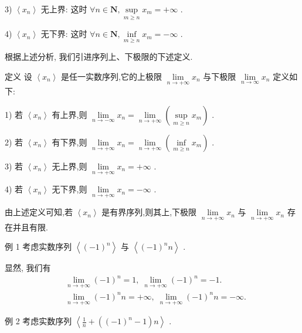 3) $\left\langle  {x}_{n}\right\rangle$ 无上界: 这时 $\forall n \in  \mathbf{N},\mathop{\sup }\limits_{{m \geq  n}}{x}_{m} =  + \infty$ .

4) $\left\langle  {x}_{n}\right\rangle$ 无下界: 这时 $\forall n \in  \mathbf{N},\mathop{\inf }\limits_{{m \geq  n}}{x}_{m} =  - \infty$ .

根据上述分析, 我们引进序列上、下极限的下述定义.

定义 设 $\left\langle  {x}_{n}\right\rangle$ 是任一实数序列,它的上极限 $\mathop{\lim }\limits_{{n \rightarrow   + \infty }}{x}_{n}$ 与下极限 $\mathop{\lim }\limits_{{n \rightarrow  \infty }}{x}_{n}$ 定义如下:

1) 若 $\left\langle  {x}_{n}\right\rangle$ 有上界,则 $\mathop{\lim }\limits_{{n \rightarrow   - \infty }}{x}_{n} = \mathop{\lim }\limits_{{n \rightarrow   + \infty }}\left( {\mathop{\sup }\limits_{{m \geq  n}}{x}_{m}}\right)$ .

2) 若 $\left\langle  {x}_{n}\right\rangle$ 有下界,则 $\mathop{\lim }\limits_{{n \rightarrow   + \infty }}{x}_{n} = \mathop{\lim }\limits_{{n \rightarrow   + \infty }}\left( {\mathop{\inf }\limits_{{m \geq  n}}{x}_{m}}\right)$ .

3) 若 $\left\langle  {x}_{n}\right\rangle$ 无上界,则 $\mathop{\lim }\limits_{{n \rightarrow   + \infty }}{x}_{n} =  + \infty$ .

4) 若 $\left\langle  {x}_{n}\right\rangle$ 无下界,则 $\mathop{\lim }\limits_{{n \rightarrow   + \infty }}{x}_{n} =  - \infty$ .

由上述定义可知,若 $\left\langle  {x}_{n}\right\rangle$ 是有界序列,则其上,下极限 $\mathop{\lim }\limits_{{n \rightarrow   + \infty }}{x}_{n}$ 与 $\mathop{\lim }\limits_{{n \rightarrow   + \infty }}{x}_{n}$ 存在并且有限.

例 1 考虑实数序列 $\left\langle  {\left( -1\right) }^{n}\right\rangle$ 与 $\left\langle  {{\left( -1\right) }^{n}n}\right\rangle$ .

显然, 我们有
\begin{align*}
	&\mathop{\lim }\limits_{{n \rightarrow   + \infty }}{\left( -1\right) }^{n} = 1,\;\mathop{\lim }\limits_{{n \rightarrow   + \infty }}{\left( -1\right) }^{n} =  - 1.\\
	&\mathop{\lim }\limits_{{n \rightarrow   + \infty }}{\left( -1\right) }^{n}n =  + \infty ,\;\mathop{\lim }\limits_{{n \rightarrow   + \infty }}{\left( -1\right) }^{n}n =  - \infty .
\end{align*}

例 2 考虑实数序列 $\left\langle  {\frac{1}{n} + \left( {{\left( -1\right) }^{n} - 1}\right) n}\right\rangle$ .

